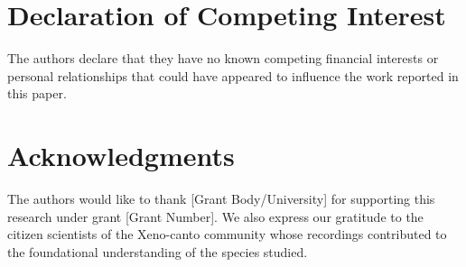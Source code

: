 \documentclass[final,5p,times,twocolumn,nolinenum]{elsarticle}
\begin{document}
\section*{Declaration of Competing Interest}
The authors declare that they have no known competing financial interests or personal relationships that could have appeared to influence the work reported in this paper.

\section*{Acknowledgments}
The authors would like to thank [Grant Body/University] for supporting this research under grant [Grant Number]. We also express our gratitude to the citizen scientists of the Xeno-canto community whose recordings contributed to the foundational understanding of the species studied.






\end{document}
